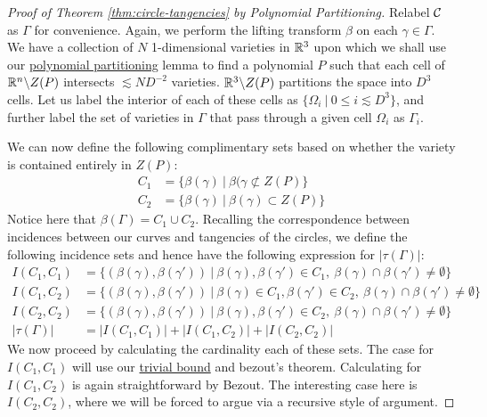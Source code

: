 \begin{proof}[Proof of Theorem \ref{thm:circle-tangencies} by Polynomial Partitioning]
Relabel $\mathcal C$ as $\Gamma$ for convenience. Again, we perform the lifting transform $\beta$ on each $\gamma \in \Gamma$. 
We have a collection of $N$ 1-dimensional varieties in $\mathbb R^3$ upon which we shall use our \hyperref[lem:poly-part-var]{polynomial partitioning} lemma
to find a polynomial $P$ such that each cell of $\mathbb R^n \backslash Z(P)$ intersects $\lesssim N D^{-2}$ varieties. 
$\mathbb R^3 \backslash Z(P)$ partitions the space into $D^3$ cells. 
Let us label the interior of each of these cells as $\{\Omega_i \ | \ 0 \leq i \lesssim D^3 \}$, and further label the set of varieties in $\Gamma$ that pass through a given cell $\Omega_i$ as $\Gamma_i$.

We can now define the following complimentary sets based on whether the variety is contained entirely in $Z(P)$:
\begin{align*}
    C_1 &= \{ \beta(\gamma) \ |\ \beta(\gamma \not \subset Z(P) \}\\
    C_2 &= \{ \beta(\gamma) \ |\ \beta(\gamma)  \subset Z(P) \}
\end{align*}
Notice here that $\beta(\Gamma) = C_1 \cup C_2$. Recalling the correspondence between incidences between our curves and tangencies of the circles, we define the following
incidence sets and hence have the following expression for $|\tau(\Gamma)|$:
\begin{align*}
    I(C_1, C_1) &= \{(\beta(\gamma), \beta(\gamma')) \ |  \ \beta(\gamma), \beta(\gamma') \in C_1, \ \beta(\gamma) \cap \beta(\gamma') \neq \emptyset \} \\
    I(C_1, C_2) &= \{(\beta(\gamma), \beta(\gamma')) \ |  \ \beta(\gamma)\in C_1, \beta(\gamma') \in C_2, \ \beta(\gamma) \cap \beta(\gamma') \neq \emptyset \} \\
    I(C_2, C_2) &= \{(\beta(\gamma), \beta(\gamma')) \ |  \ \beta(\gamma), \beta(\gamma') \in C_2, \ \beta(\gamma) \cap \beta(\gamma') \neq \emptyset \} \\
    |\tau(\Gamma)| &= |I(C_1, C_1)| + |I(C_1, C_2)| + |I(C_2, C_2)|
\end{align*}
We now proceed by calculating the cardinality each of these sets. The case for $I(C_1,C_1)$ will use our \hyperref[thm:trivial-circle-bound]{trivial bound} and bezout's
theorem. Calculating for $I(C_1,C_2)$ is again straightforward by Bezout. 
The interesting case here is $I(C_2,C_2)$, where we will be forced to argue via a recursive style of argument.


\end{proof}
